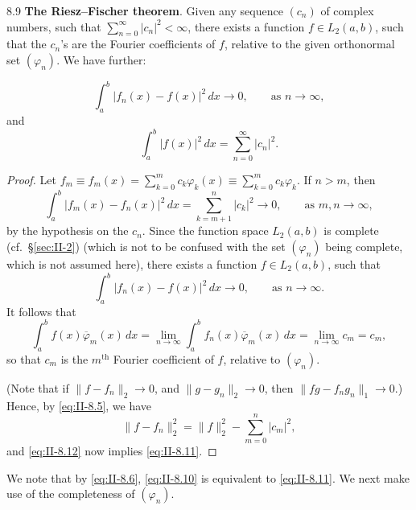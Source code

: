 \begin{nstmt}{8.9}\label{eq:II-8.9}
\textbf{The Riesz--Fischer theorem}. Given any sequence $(c_{n})$ of complex numbers, such that $\sum_{n=0}^{\infty}|c_{n}|^{2}<\infty$, there exists a function $f\in L_{2}(a,b)$, such that the $c_{n}$'s are the Fourier coefficients of $f$, relative to the given orthonormal set $(\varphi_{n})$. We have further:
\end{nstmt}
\begin{equation}\tag{8.10}\label{eq:II-8.10}
\int_{a}^{b}|f_{n}(x)-f(x)|^{2}\,dx\to 0,\qquad\text{as }n\to\infty,
\end{equation}
and
\begin{equation}\tag{8.11}\label{eq:II-8.11}
\int_{a}^{b}|f(x)|^{2}\,dx=\sum_{n=0}^{\infty}|c_{n}|^{2}.
\end{equation}
\begin{proof}
Let $f_{m}\equiv f_{m}(x)=\sum_{k=0}^{m}c_{k}\varphi_{k}(x)\equiv\sum_{k=0}^{m}c_{k}\varphi_{k}$. If $n>m$, then
\[
\int_{a}^{b}|f_{m}(x)-f_{n}(x)|^{2}\,dx=\sum_{k=m+1}^{n}|c_{k}|^{2}\to 0,\qquad\text{as }m,n\to\infty,
\]
by the hypothesis on the $c_{n}$. Since the function space $L_{2}(a,b)$ is complete (cf.\ \S\ref{sec:II-2}) (which is not to be confused with the set $(\varphi_{n})$ being complete, which is not assumed here), there exists a function $f\in L_{2}(a,b)$, such that
\begin{equation}\tag{8.12}\label{eq:II-8.12}
\int_{a}^{b}|f_{n}(x)-f(x)|^{2}\,dx\to 0,\qquad\text{as }n\to\infty.
\end{equation}
It follows that
\[
\int_{a}^{b}f(x)\overline{\varphi}_{m}(x)\,dx
=\lim_{n\to\infty}\int_{a}^{b}f_{n}(x)\overline{\varphi}_{m}(x)\,dx
=\lim_{n\to\infty}c_{m}=c_{m},
\]
so that $c_{m}$ is the $m^{\text{th}}$ Fourier coefficient of $f$, relative to $(\varphi_{n})$.

(Note that if $\|f-f_{n}\|_{2}\to 0$, and $\|g-g_{n}\|_{2}\to 0$, then $\|fg-f_{n}g_{n}\|_{1}\to 0$.) Hence, by \eqref{eq:II-8.5}, we have
\[
\|f-f_{n}\|_{2}^{2}=\|f\|_{2}^{2}-\sum_{m=0}^{n}|c_{m}|^{2},
\]
and \eqref{eq:II-8.12} now implies \eqref{eq:II-8.11}.
\end{proof}

\begin{remark}
We note that by \eqref{eq:II-8.6}, \eqref{eq:II-8.10} is equivalent to \eqref{eq:II-8.11}. We next make use of the completeness of $(\varphi_{n})$.
\end{remark}

